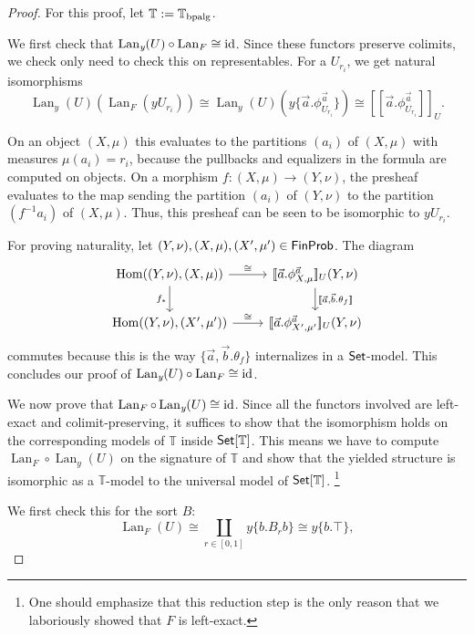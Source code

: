 \documentclass[a4paper]{amsproc}
\theoremstyle{plain}
\theoremstyle{definition}
\theoremstyle{remark}
\numberwithin{equation}{section}
\newcommand{\id}{\textup{id}}
\DeclareMathOperator{\Hom}{Hom}
\newcommand{\y}{\textit{y}}
\DeclareMathOperator{\Lan}{Lan}
\newcommand{\Set}{\textup{\textsf{Set}}}
\newcommand{\FinProb}{\textup{\textsf{FinProb}}}
\newcommand{\ldoub}{[\![}
\newcommand{\rdoub}{]\!]}
\begin{document}
\begin{proof}
For this proof, let $\mathbb{T} := \mathbb{T}_{\textup{bpalg}}$.

We first check that $\Lan_{\y}(U) \circ \Lan_F \cong \id$. Since these functors preserve colimits, we check only need to check this on representables. For a $U_{r_i}$, we get natural isomorphisms 
\begin{equation*}
\Lan_{\y}(U)(\Lan_F(\y U_{r_i}))
\cong \Lan_{\y}(U)(\y \{\vec{a} . \phi^{\vec{a}}_{U_{r_i}} \})
\cong \ldoub \vec{a} . \phi^{\vec{a}}_{U_{r_i}} \rdoub_U .
\end{equation*}

On an object $(X,\mu)$ this evaluates to the partitions $(a_i)$ of $(X,\mu)$ with measures $\mu(a_i) = r_i$, because the pullbacks and equalizers in the formula are computed on objects. On a morphism $f: (X,\mu) \to (Y,\nu)$, the presheaf evaluates to the map sending the partition $(a_i)$ of $(Y,\nu)$ to the partition $(f^{-1}a_i)$ of $(X,\mu)$. Thus, this presheaf can be seen to be isomorphic to $\y U_{r_i}$.

For proving naturality, let $(Y,\nu), (X,\mu), (X',\mu') \in \FinProb$. The diagram
\[
\begin{tikzcd}
    {\Hom((Y,\nu),(X,\mu))} \arrow[r, "\cong"] \arrow[d, "f_*"'] & {\ldoub \vec{a} . \phi^{\vec{a}}_{X,\mu} \rdoub_U (Y,\nu)} \arrow[d, "{\ldoub \vec{a},\vec{b} . \theta_f \rdoub}"] \\
    {\Hom((Y,\nu),(X',\mu'))} \arrow[r, "\cong"]                 & {\ldoub \vec{a} . \phi^{\vec{a}}_{X',\mu'} \rdoub_U (Y,\nu)}
\end{tikzcd}
\]
commutes because this is the way $\{\vec{a},\vec{b} . \theta_f \}$ internalizes in a $\Set$-model. This concludes our proof of $\Lan_{\y}(U) \circ \Lan_F \cong \id$.

We now prove that $\Lan_F \circ \Lan_{\y}(U) \cong \id$. Since all the functors involved are left-exact and colimit-preserving, it suffices to show that the isomorphism holds on the corresponding models of $\mathbb{T}$ inside $\Set[\mathbb{T}]$. This means we have to compute $\Lan_F \circ \Lan_{\y}(U)$ on the signature of $\mathbb{T}$ and show that the yielded structure is isomorphic as a $\mathbb{T}$-model to the universal model of $\Set[\mathbb{T}]$. \footnote{One should emphasize that this reduction step is the only reason that we laboriously showed that $F$ is left-exact.}

We first check this for the sort $B$:
\begin{equation}\label{lan_on_sort}
\Lan_F(U) \cong \coprod_{r \in [0,1]} \y \{b . B_r b\} \cong \y \{b . \top\}, \tag{*}
\end{equation}


\end{proof}
\end{document}
